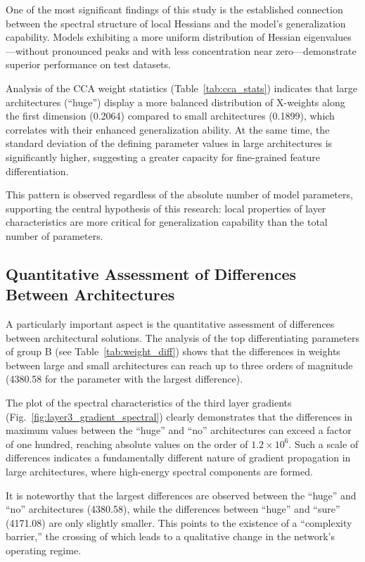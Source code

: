 \documentclass[a4paper,12pt]{article}
\begin{document}
One of the most significant findings of this study is the established connection between the spectral
structure of local Hessians and the model's generalization capability. Models exhibiting a more uniform
distribution of Hessian eigenvalues—without pronounced peaks and with less concentration near
zero—demonstrate superior performance on test datasets.

Analysis of the CCA weight statistics (Table~\ref{tab:cca_stats}) indicates that large architectures
(``huge'') display a more balanced distribution of X-weights along the first dimension (0.2064) compared to
small architectures (0.1899), which correlates with their enhanced generalization ability. At the same time,
the standard deviation of the defining parameter values in large architectures is significantly higher,
suggesting a greater capacity for fine-grained feature differentiation.

This pattern is observed regardless of the absolute number of model parameters, supporting the central
hypothesis of this research: local properties of layer characteristics are more critical for generalization
capability than the total number of parameters.

\subsection{Quantitative Assessment of Differences Between Architectures}

A particularly important aspect is the quantitative assessment of differences between architectural
solutions. The analysis of the top differentiating parameters of group B (see Table~\ref{tab:weight_diff})
shows that the differences in weights between large and small architectures can reach up to three orders of
magnitude (4380.58 for the parameter with the largest difference).

The plot of the spectral characteristics of the third layer gradients
(Fig.~\ref{fig:layer3_gradient_spectral}) clearly demonstrates that the differences in maximum values between
the ``huge'' and ``no'' architectures can exceed a factor of one hundred, reaching absolute values on the
order of $1.2\times10^6$. Such a scale of differences indicates a fundamentally different nature of gradient
propagation in large architectures, where high-energy spectral components are formed.

It is noteworthy that the largest differences are observed between the ``huge'' and ``no'' architectures
(4380.58), while the differences between ``huge'' and ``sure'' (4171.08) are only slightly smaller. This
points to the existence of a ``complexity barrier,'' the crossing of which leads to a qualitative change in
the network's operating regime.
\end{document}
